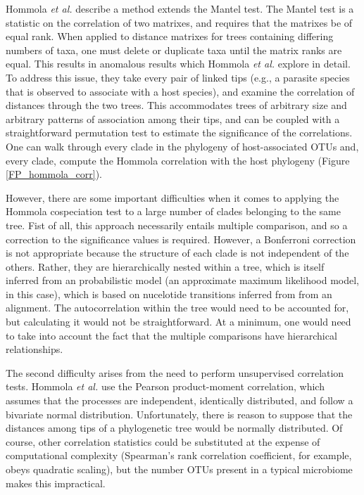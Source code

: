 Hommola {\em et al.} \cite{hommola2009permutation} describe a method extends the Mantel test. \cite{mantel1967detection} The Mantel test is a statistic on the correlation of two matrixes, and requires that the matrixes be of equal rank. When applied to distance matrixes for trees containing differing numbers of taxa, one must delete or duplicate taxa until the matrix ranks are equal. This results in anomalous results which Hommola {\em et al.} explore in detail. To address this issue, they take every pair of linked tips (e.g., a parasite species that is observed to associate with a host species), and examine the correlation of distances through the two trees. This accommodates trees of arbitrary size and arbitrary patterns of association among their tips, and can be coupled with a straightforward permutation test to estimate the significance of the correlations. One can walk through every clade in the phylogeny of host-associated OTUs and, every clade, compute the Hommola correlation with the host phylogeny (Figure \ref{FP_hommola_corr}). 



However, there are some important difficulties when it comes to applying the Hommola cospeciation test to a large number of clades belonging to the same tree. Fist of all, this approach necessarily entails multiple comparison, and so a correction to the significance values is required. However, a Bonferroni correction is not appropriate because the structure of each clade is not independent of the others. Rather, they are hierarchically nested within a tree, which is itself inferred from an probabilistic model (an approximate maximum likelihood model, in this case), which is based on nucelotide transitions inferred from from an alignment. The autocorrelation within the tree would need to be accounted for, but calculating it would not be straightforward. At a minimum, one would need to take into account the fact that the multiple comparisons have hierarchical relationships.

The second difficulty arises from the need to perform unsupervised correlation tests. Hommola {\em et al.} use the Pearson product-moment correlation, which assumes that the processes are independent, identically distributed, and follow a bivariate normal distribution. Unfortunately, there is reason to suppose that the distances among tips of a phylogenetic tree would be normally distributed. Of course, other correlation statistics could be substituted at the expense of computational complexity (Spearman's rank correlation coefficient, for example, obeys quadratic scaling), but the number OTUs present in a typical microbiome makes this impractical.

